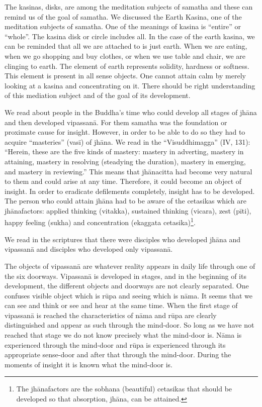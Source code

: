 The kasinas, disks, are among the meditation subjects of samatha and these can remind us of the goal of samatha. We discussed the Earth Kasina, one of the meditation subjects of samatha. One of the meanings of kasina is ``entire'' or ``whole''. The kasina disk or circle includes all. In the case of the earth kasina, we can be reminded that all we are attached to is just earth. When we are eating, when we go shopping and buy clothes, or when we use table and chair, we are clinging to earth. The element of earth represents solidity, hardness or softness. This element is present in all sense objects. One cannot attain calm by merely looking at a kasina and concentrating on it. There should be right understanding of this mediation subject and of the goal of its development.

We read about people in the Buddha’s time who could develop all stages of jhāna and then developed vipassanā. For them samatha was the foundation or proximate cause for insight. However, in order to be able to do so they had to acquire ``masteries'' (vasī) of jhāna. We read in the ``Visuddhimagga'' (IV, 131): ``Herein, these are the five kinds of mastery: mastery in adverting, mastery in attaining, mastery in resolving (steadying the duration), mastery in emerging, and mastery in reviewing.'' This means that jhānacitta had become very natural to them and could arise at any time. Therefore, it could become an object of insight. In order to eradicate defilements completely, insight has to be developed. The person who could attain jhāna had to be aware of the cetasikas which are jhānafactors: applied thinking (vitakka), sustained thinking (vicara), zest (pīti), happy feeling (sukha) and concentration (ekaggata cetasika)\footnote{The jhānafactors are the sobhana (beautiful) cetasikas that should be developed so that absorption, jhāna, can be attained.}.

We read in the scriptures that there were disciples who developed jhāna and vipassanā and disciples who developed only vipassanā.

The objects of vipassanā are whatever reality appears in daily life through one of the six doorways. Vipassanā is developed in stages, and in the beginning of its development, the different objects and doorways are not clearly separated. One confuses visible object which is rūpa and seeing which is nāma. It seems that we can see and think or see and hear at the same time. When the first stage of vipassanā is reached the characteristics of nāma and rūpa are clearly distinguished and appear as such through the mind-door. So long as we have not reached that stage we do not know precisely what the mind-door is. Nāma is experienced through the mind-door and rūpa is experienced through its appropriate sense-door and after that through the mind-door. During the moments of insight it is known what the mind-door is.

